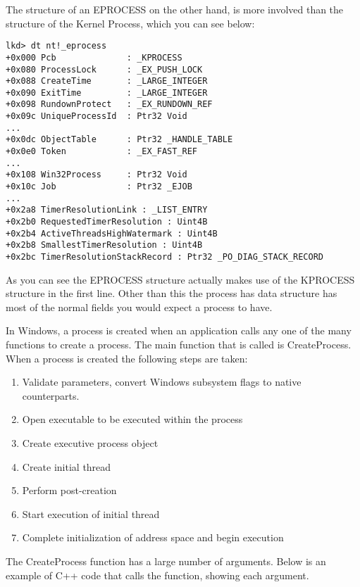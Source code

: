 \documentclass[letterpaper,10pt,titlepage,draftclsnofoot,onecolumn]{IEEEtran}
\begin{document}
The structure of an EPROCESS on the other hand, is more involved than the structure of the Kernel Process, which you can see below:

\begin{lstlisting}
lkd> dt nt!_eprocess
+0x000 Pcb				: _KPROCESS
+0x080 ProcessLock		: _EX_PUSH_LOCK
+0x088 CreateTime		: _LARGE_INTEGER
+0x090 ExitTime			: _LARGE_INTEGER
+0x098 RundownProtect	: _EX_RUNDOWN_REF
+0x09c UniqueProcessId 	: Ptr32 Void
...
+0x0dc ObjectTable		: Ptr32 _HANDLE_TABLE
+0x0e0 Token			: _EX_FAST_REF
...
+0x108 Win32Process		: Ptr32 Void
+0x10c Job				: Ptr32 _EJOB
...
+0x2a8 TimerResolutionLink : _LIST_ENTRY
+0x2b0 RequestedTimerResolution : Uint4B	
+0x2b4 ActiveThreadsHighWatermark : Uint4B
+0x2b8 SmallestTimerResolution : Uint4B
+0x2bc TimerResolutionStackRecord : Ptr32 _PO_DIAG_STACK_RECORD
\end{lstlisting}

As you can see the EPROCESS structure actually makes use of the KPROCESS structure in the first line. Other than this the process has data structure has most of the normal fields you would expect a process to have. 

In Windows, a process is created when an application calls any one of the many functions to create a process. The main function that is called is CreateProcess. When a process is created the following steps are taken: 

\begin{enumerate}
\item Validate parameters, convert Windows subsystem flags to native counterparts. 
\item Open executable to be executed within the process
\item Create executive process object
\item Create initial thread
\item Perform post-creation
\item Start execution of initial thread
\item Complete initialization of address space and begin execution
\end{enumerate}

The CreateProcess function has a large number of arguments. Below is an example of C++ code that calls the function, showing each argument.
\end{document}
